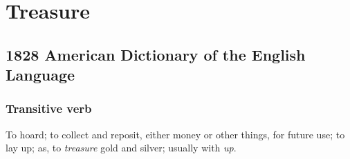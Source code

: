 \section{Treasure}
	\label{TREASURE}
	

\subsection{1828 American Dictionary of the English Language} %
	\label{TREASURE-1828}

	\subsubsection{Transitive verb}

		\begin{compactitem}
			\item To hoard; to collect and reposit, either money or other things, for future use; to lay up; as, to \textit{treasure} gold and silver; usually with \textit{up}.
		\end{compactitem}


	

	
